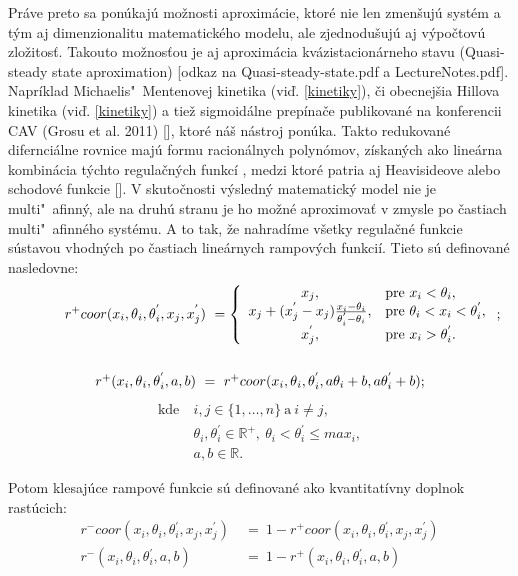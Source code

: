 \documentclass[11pt,final,oneside]{fithesis}
\begin{document}
Pr\'ave preto sa pon\'ukaj\'u mo\v znosti aproxim\'acie, ktor\'e nie len zmen\v suj\'u syst\'em a t\'ym aj dimenzionalitu matematick\'eho modelu, 
ale zjednodu\v suj\'u aj v\'ypo\v ctov\'u zlo\v zitos\v t. Takouto mo\v znos\v tou je aj aproxim\'acia kv\'azistacion\'arneho stavu 
(Quasi-steady state aproximation) [odkaz na Quasi-steady-state.pdf a LectureNotes.pdf]. Napr\'iklad Michaelis"~Mentenovej kinetika (vi\v d. \ref{kinetiky}), 
\v ci obecnej\v sia Hillova kinetika (vi\v d. \ref{kinetiky}) a tie\v z sigmoid\'alne prep\'ina\v ce publikovan\'e na konferencii CAV (Grosu et al. 2011) [], 
ktor\'e n\'a\v s n\'astroj pon\'uka. Takto redukovan\' e difernci\'alne rovnice maj\'u formu 
racion\'alnych polyn\'omov, z\'iskan\'ych ako line\'arna kombin\'acia t\'ychto regula\v cn\'ych funkc\'i%
, medzi ktor\'e patria aj Heavisideove alebo schodov\'e funkcie []. 
V skuto\v cnosti v\'ysledn\'y 
matematick\'y model nie je multi"~afinn\'y, ale na druh\'u stranu je ho mo\v zn\'e aproximova\v t v zmysle po \v castiach mul\-ti"~afin\-n\'eho syst\'emu. 
A to tak, \v ze nahrad\'ime v\v setky regula\v cn\'e funkcie s\'ustavou vhodn\'ych po \v castiach line\'arnych rampov\'ych funkci\'i. Tieto s\'u definovan\'e 
nasledovne:
\begin{align*}
	r^+coor (x_i,\theta{}_i,\theta{}_i^{'},x_j,x_j^{'}) \ = \left\{ \begin{array}{cl}
x_j, & \textrm{pre} \ x_i < \theta_i,\\
x_j + (x_j^{'} - x_j)\frac{x_i - \theta_i}{\theta_i^{'} - \theta_i}, & \textrm{pre} \ \theta_i < x_i < \theta_i^{'},\\
x_j^{'}, & \textrm{pre} \ x_i > \theta_i^{'}.
	\end{array}
	\right.;
	\\
	\\
	\centerline{$r^+ (x_i, \theta{}_i, \theta{}_i^{'}, a,b) \ = \ r^+coor (x_i,\theta{}_i,\theta{}_i^{'},a\theta_i + b,a\*\theta_i^{'} + b)$;}
\end{align*}
\begin{align*}
	\textrm{kde} \ &i, j \in \{1,\dots{},n\} \ \textrm{a} \ i \neq j,\\
	&\theta_i, \theta_i^{'} \in \mathbb{R}^+, \ \theta_i < \theta_i^{'} \leq max_i,\\
	&a, b \in \mathbb{R}.
\end{align*}

Potom klesaj\'uce rampov\'e funkcie s\'u definovan\'e ako kvantitat\'ivny doplnok rast\'ucich:
\begin{align*}
r^-coor (x_i,\theta{}_i,\theta{}_i^{'},x_j,x_j^{'}) &\ = \ 1 - r^+coor (x_i,\theta{}_i,\theta{}_i^{'},x_j,x_j^{'})\\
r^- (x_i, \theta{}_i, \theta{}_i^{'}, a,b) &\ = \ 1 - r^+ (x_i, \theta{}_i, \theta{}_i^{'}, a,b)
\end{align*}
\end{document}
